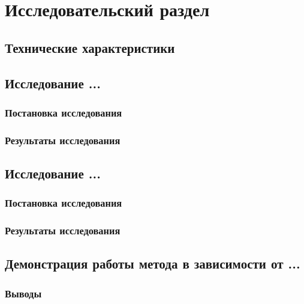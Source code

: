\chapter{Исследовательский раздел}


\section{Технические характеристики}
\section{Исследование ...}
\subsection*{Постановка исследования}
\subsection*{Результаты исследования}
\section{Исследование ...}
\subsection*{Постановка исследования}
\subsection*{Результаты исследования}
\section{Демонстрация работы метода в зависимости от ...}
\subsection*{Выводы}
